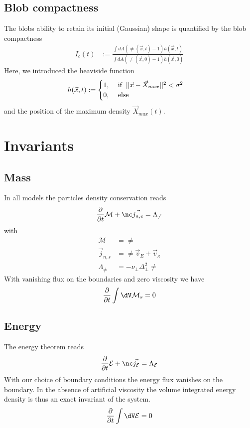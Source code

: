\subsection{Blob compactness}
The blobs ability to retain its initial (Gaussian) shape is quantified by the  blob compactness
\begin{align}
     I_c(t) &:= \frac{\int dA (\ne(\vec{x},t)-1) h(\vec{x},t)}{\int dA
(\ne(\vec{x},0)-1) h(\vec{x},0)}
\end{align}
Here, we introduced the heaviside function
\begin{align}
     h(\vec{x},t) &:= \begin{cases}
          1,
        &\ \text{if} \hspace{2mm}||\vec{x} - \vec{X}_{max}||^2 < \sigma^2 \\
0,  &\ \text{else}
           \end{cases} \nonumber
\end{align}
and the position of the maximum density \( \vec{X}_{max}(t)\).


\section{Invariants}
\subsection{Mass}
In all models the particles density conservation reads
\begin{align} \label{eq:mass_theorem}
  \frac{\partial}{\partial t} \mathcal M
  + \nc\vec{ j_{n,e}}
  =  \Lambda_{\ne}
\end{align}
with
\begin{align}
    \mathcal M &= \ne \\
    \vec j_{n,s} &= \ne \vec v_E + \vec v_\kappa \\
     \Lambda_\ne &= -\nu_\perp \Delta_\perp^2 \ne
\end{align}
With vanishing flux on the boundaries and zero viscosity we have
\begin{align}
    \frac{\partial}{\partial t} \int \dV \mathcal M_s = 0
\end{align}

\subsection{Energy}
The energy theorem reads
\begin{align} \label{eq:energy_theorem}
  \frac{\partial}{\partial t} \mathcal E
  + \nc\vec{ j_{\mathcal E}}
  =  \Lambda_{\mathcal E}
\end{align}
With our choice of boundary conditions the energy flux
vanishes on the boundary.
In the absence of artificial viscosity the volume integrated
 energy density is thus an exact invariant of the system.
\begin{align}
    \frac{\partial}{\partial t} \int \dV \mathcal E = 0
\end{align}


